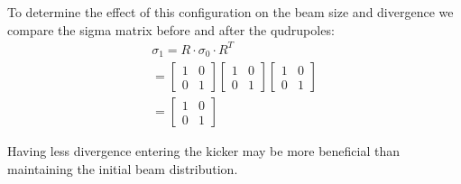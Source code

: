 To determine the effect of this configuration on the beam size and divergence
we compare the sigma matrix before and after the qudrupoles:
\begin{align}
	\sigma_1 = R\cdot \sigma_0 \cdot R^T \\
	= 
	\begin{bmatrix}
	1 & 0 \\
	0 & 1	
	\end{bmatrix}
	\begin{bmatrix}
	1 & 0 \\
	0 & 1	
	\end{bmatrix}
    \begin{bmatrix}
	1 & 0 \\
	0 & 1	
	\end{bmatrix} \\
	=
	\begin{bmatrix}
	1 & 0 \\
	0 & 1	
	\end{bmatrix}
\end{align}

Having less divergence entering the kicker may be more beneficial than 
maintaining the initial beam distribution. 

